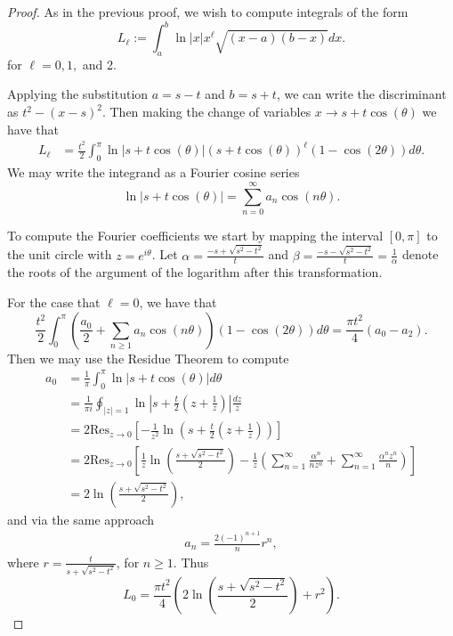 \documentclass[10pt]{article}
\theoremstyle{plain}
\theoremstyle{definition}
\theoremstyle{plain}
\begin{document}
\begin{proof}
As in the previous proof, we wish to compute integrals of the form 
\begin{equation*}
 L_{\ell}:= \int_{a}^{b} \ln|x| x^\ell \sqrt{(x-a)(b-x)}dx.
\end{equation*}
for $\ell = 0,1,$ and 2. 


Applying the substitution $a=s-t$ and $b= s+t$, we can write the discriminant as $t^2 - (x-s)^2$. Then making the change of variables $x \rightarrow s+t\cos (\theta)$ we have that
\begin{align*}
 L_{\ell}
 &=\frac{t^2}{2}\int_{0}^{\pi} \ln|s+t\cos (\theta)| (s+t\cos (\theta))^\ell \left(1-\cos(2 \theta)\right) d \theta.
\end{align*}
We may write the integrand as a Fourier cosine series 
\begin{equation*}
 \ln|s+ t \cos(\theta)| =  \sum_{n=0}^{\infty} a_{n}\cos( n \theta).
\end{equation*}



To compute the Fourier coefficients we start by mapping the interval $[0,\pi]$ to the unit circle with $z = e^{i\theta}$. Let $\alpha = \frac{-s+\sqrt{s^2-t^2}}{t}$ and $\beta = \frac{-s-\sqrt{s^2-t^2}}{t}= \frac{1}{\alpha}$ denote the roots of the argument of the logarithm after this transformation. 

For the case that $\ell=0$, we have that 
$$
 \frac{t^2}{2}\int_0^\pi\left(\frac{a_0}{2}+\sum_{n \geq 1} a_n \cos (n \theta)\right)\left(1-\cos (2 \theta)\right) d \theta= \frac{\pi t^2}{4}\left(a_0-a_2\right).
$$
Then we may use the Residue Theorem to compute
\begin{align*}
 a_{0} &= \frac{1}{\pi}\int_{0}^{\pi}\ln|s+t \cos(\theta)|d\theta \\
 &=\frac{1}{\pi i} \oint_{|z|=1}\ln\left| s+ \frac{t}{2}\left(z+\frac{1}{z} \right)\right|\frac{dz}{z}\\
 &=2\text{Res}_{z\rightarrow 0}\left[-\frac{1}{z^2}\ln\left( s+ \frac{t}{2}\left(z+\frac{1}{z} \right)\right)\right]\\
 &= 2 \text{Res}_{z\rightarrow 0}\left[\frac{1}{z}\ln \left(\frac{s+\sqrt{s^2-t^2}}{2}\right)-\frac{1}{z}\left(\sum_{n=1}^{\infty} \frac{\alpha^n}{n z^n}+\sum_{n=1}^{\infty} \frac{\alpha^n z^n}{n} \right)\right]\\
 &= 2\ln \left(\frac{s+\sqrt{s^2-t^2}}{2}\right),
\end{align*}
and via the same approach
\begin{align*}
 a_{n} = \frac{2(-1)^{n+1}}{n} r^{n},
\end{align*}
where $r = \frac{t}{s + \sqrt{s^2 -t^2}}$, for $n\geq 1$. Thus
\begin{equation*}
 L_{0} = \frac{\pi t^2}{4} \left( 2\ln \left(\frac{s+\sqrt{s^2-t^2}}{2}\right) +r^2 \right).
\end{equation*}



\end{proof}
\end{document}
